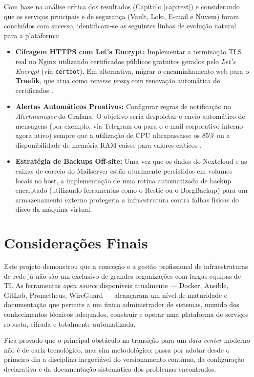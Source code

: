 Com base na análise crítica dos resultados (Capítulo \ref{cap:test}) e considerando que os serviços principais e de segurança (Vault, Loki, E-mail e Nuvem) foram concluídos com sucesso, identificam-se as seguintes linhas de evolução natural para a plataforma:

\begin{itemize}
    \item \textbf{Cifragem HTTPS com Let's Encrypt:} Implementar a terminação TLS real no Nginx utilizando certificados públicos gratuitos gerados pelo \textit{Let's Encrypt} (via \texttt{certbot}). Em alternativa, migrar o encaminhamento web para o \textbf{Traefik}, que atua como \textit{reverse proxy} com renovação automática de certificados \cite{rfc8446}.

    \item \textbf{Alertas Automáticos Proativos:} Configurar regras de notificação no \textit{Alertmanager} do Grafana. O objetivo seria despoletar o envio automático de mensagens (por exemplo, via Telegram ou para o e-mail corporativo interno agora ativo) sempre que a utilização de CPU ultrapassasse os 85\% ou a disponibilidade de memória RAM caísse para valores críticos \cite{grafana_docs}.

    \item \textbf{Estratégia de Backups Off-site:} Uma vez que os dados do Nextcloud e as caixas de correio do Mailserver estão atualmente persistidos em volumes locais no host, a implementação de uma rotina automatizada de backup encriptado (utilizando ferramentas como o Restic ou o BorgBackup) para um armazenamento externo protegeria a infraestrutura contra falhas físicas do disco da máquina virtual.
\end{itemize}

\section{Considerações Finais}

Este projeto demonstrou que a conceção e a gestão profissional de infraestruturas de rede já não são um exclusivo de grandes organizações com largas equipas de TI. As ferramentas \textit{open source} disponíveis atualmente --- Docker, Ansible, GitLab, Prometheus, WireGuard --- alcançaram um nível de maturidade e documentação que permite a um único administrador de sistemas, munido dos conhecimentos técnicos adequados, construir e operar uma plataforma de serviços robusta, cifrada e totalmente automatizada. 

Fica provado que o principal obstáculo na transição para um \textit{data center} moderno não é de cariz tecnológico, mas sim metodológico: passa por adotar desde o primeiro dia a disciplina inegociável do versionamento contínuo, da configuração declarativa e da documentação sistemática dos problemas encontrados.